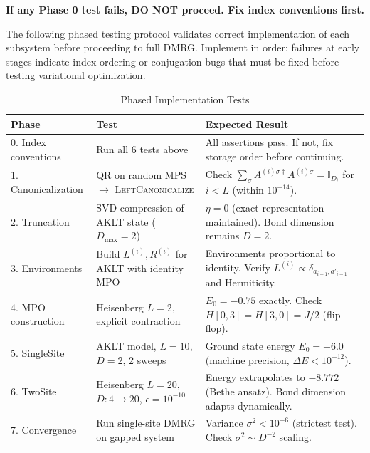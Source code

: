 \documentclass[aps,prb,onecolumn,scriptaddress]{revtex4-2}
\newcommand{\eps}{\epsilon}
\begin{document}
	\textbf{If any Phase 0 test fails, DO NOT proceed. Fix index conventions first.}
	
	\vspace{1em}
	
	The following phased testing protocol validates correct implementation of each subsystem before proceeding to full DMRG. Implement in order; failures at early stages indicate index ordering or conjugation bugs that must be fixed before testing variational optimization.
	
	\begin{table}[htbp]
		\centering
		\caption{Phased Implementation Tests}
		\label{tab:verification}
		\begin{tabularx}{\textwidth}{@{}l>{\raggedright\arraybackslash}p{3.5cm}X@{}}
			\toprule
			\textbf{Phase} & \textbf{Test} & \textbf{Expected Result} \\
			\midrule
			0. Index conventions & 
			Run all 6 tests above & 
			All assertions pass. If not, fix storage order before continuing. \\
			\midrule
			1. Canonicalization & 
			QR on random MPS $\to$ \textsc{LeftCanonicalize} & 
			Check $\sum_\sigma A^{(i)\sigma\dagger} A^{(i)\sigma} = \mathbb{I}_{D_i}$ for $i<L$ (within $10^{-14}$). \\
			\midrule
			2. Truncation & 
			SVD compression of AKLT state ($D_{\max}=2$) & 
			$\eta = 0$ (exact representation maintained). Bond dimension remains $D=2$. \\
			\midrule
			3. Environments & 
			Build $L^{(i)}, R^{(i)}$ for AKLT with identity MPO & 
			Environments proportional to identity. Verify $L^{(i)} \propto \delta_{a_{i-1},a'_{i-1}}$ and Hermiticity. \\
			\midrule
			4. MPO construction & 
			Heisenberg $L=2$, explicit contraction & 
			$E_0 = -0.75$ exactly. Check $H[0,3] = H[3,0] = J/2$ (flip-flop). \\
			\midrule
			5. SingleSite & 
			AKLT model, $L=10$, $D=2$, 2 sweeps & 
			Ground state energy $E_0 = -6.0$ (machine precision, $\Delta E < 10^{-12}$). \\
			\midrule
			6. TwoSite & 
			Heisenberg $L=20$, $D: 4\to20$, $\eps=10^{-10}$ & 
			Energy extrapolates to $-8.772$ (Bethe ansatz). Bond dimension adapts dynamically. \\
			\midrule
			7. Convergence & 
			Run single-site DMRG on gapped system & 
			Variance $\sigma^2 < 10^{-6}$ (strictest test). Check $\sigma^2 \sim D^{-2}$ scaling. \\
			\bottomrule
		\end{tabularx}
	\end{table}
	
\end{document}

